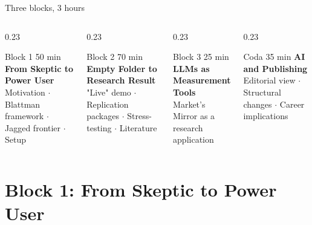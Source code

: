 \documentclass[aspectratio=169, 10pt]{beamer}
\begin{document}
\begin{frame}{Three blocks, 3 hours}
  \begin{columns}[T]
    \begin{column}{0.23\textwidth}
      \begin{block}{Block 1 \hfill 50 min}
        \textbf{From Skeptic to Power User}\\[0.3em]
        \small Motivation $\cdot$ Blattman framework $\cdot$
        Jagged frontier $\cdot$ Setup
      \end{block}
    \end{column}
    \begin{column}{0.23\textwidth}
      \begin{block}{Block 2 \hfill 70 min}
        \textbf{Empty Folder to Research Result}\\[0.3em]
        \small "Live" demo $\cdot$ Replication packages $\cdot$
        Stress-testing $\cdot$ Literature
      \end{block}
    \end{column}
    \begin{column}{0.23\textwidth}
      \begin{block}{Block 3 \hfill 25 min}
        \textbf{LLMs as Measurement Tools}\\[0.3em]
        \small Market's Mirror as a research application
      \end{block}
    \end{column}
    \begin{column}{0.23\textwidth}
      \begin{block}{Coda \hfill 35 min}
        \textbf{AI and Publishing}\\[0.3em]
        \small Editorial view $\cdot$ Structural changes $\cdot$
        Career implications
      \end{block}
    \end{column}
  \end{columns}
  \vfill
  \begin{center}
    \small\color{black!60}
   
  \end{center}
\end{frame}


\section{Block 1: From Skeptic to Power User}
\end{document}
